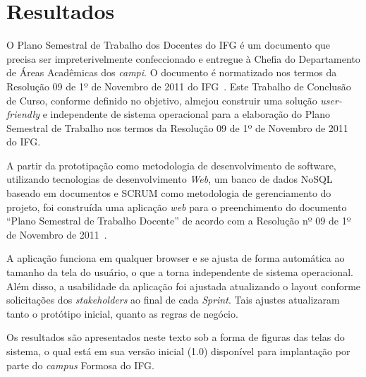 \chapter{Resultados}
\label{Resultados}

O Plano Semestral de Trabalho dos Docentes do \ac{IFG} é um documento que precisa ser impreterivelmente confeccionado e entregue à Chefia do Departamento de Áreas Acadêmicas dos \textit{campi}.
O documento é normatizado nos termos da Resolução 09 de 1º de Novembro de 2011 do \ac{IFG}~\citep{resolucao}.
Este Trabalho de Conclusão de Curso, conforme definido no objetivo, almejou construir uma solução \textit{user-friendly} e independente de sistema operacional para a elaboração do Plano Semestral de Trabalho nos termos da Resolução 09 de 1º de Novembro de 2011 do \ac{IFG}.

A partir da prototipação como metodologia de desenvolvimento de software, utilizando tecnologias de desenvolvimento \textit{Web}, um banco de dados \ac{NoSQL} baseado em documentos e SCRUM como metodologia de gerenciamento do projeto, foi construída uma aplicação \textit{web} para o preenchimento do documento ``Plano Semestral de Trabalho Docente'' de acordo com a Resolução nº 09 de 1º de Novembro de 2011~\citep{resolucao}.

A aplicação funciona em qualquer browser e se ajusta de forma automática ao tamanho da tela do usuário, o que a torna independente de sistema operacional.
Além disso, a usabilidade da aplicação foi ajustada atualizando o layout conforme solicitações dos \textit{stakeholders} ao final de cada \textit{Sprint}.
Tais ajustes atualizaram tanto o protótipo inicial, quanto as regras de negócio.

Os resultados são apresentados neste texto sob a forma de figuras das telas do sistema, o qual está em sua versão inicial (1.0) disponível para implantação por parte do \textit{campus} Formosa do \ac{IFG}.

